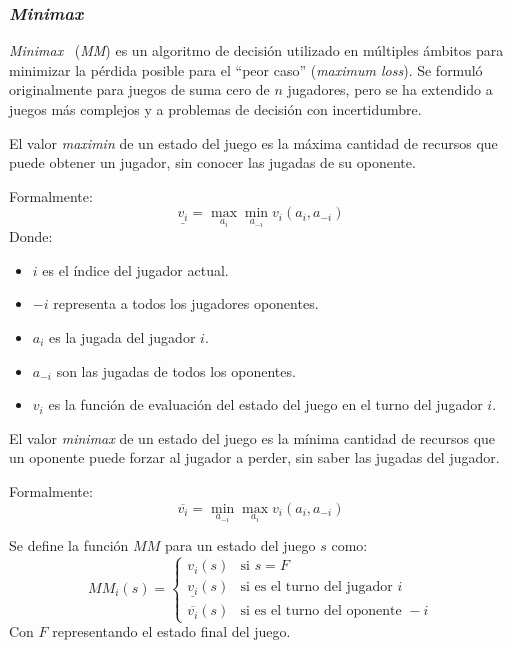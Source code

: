 \subsubsection{\textit{Minimax}}
  \textit{Minimax}~\cite{fanMinimaxTheorems1953} (\textit{MM}) es un 
  algoritmo de decisión utilizado en múltiples ámbitos para minimizar la pérdida posible para 
  el \enquote{peor caso} (\textit{maximum loss}). 
  Se formuló originalmente para juegos de suma cero de \(n\) jugadores, pero se ha extendido a
  juegos más complejos y a problemas de decisión con incertidumbre.

  \begin{definition}
    El valor \textit{maximin} de un estado del juego es la máxima cantidad de recursos que puede 
    obtener un jugador, sin conocer las jugadas de su oponente. 

    Formalmente:
    \[
      \underline{v_{i}} = \max_{a_{i}}\min_{a_{-i}}v_{i}(a_{i},a_{-i})
    \]
    Donde:
    \begin{itemize}
      \item \(i\) es el índice del jugador actual.
      \item \(-i\) representa a todos los jugadores oponentes. 
      \item \(a_i\) es la jugada del jugador \(i\).
      \item \(a_{-i}\) son las jugadas de todos los oponentes.
      \item \(v_i\) es la función de evaluación del estado del juego en el turno del jugador 
        \(i\).
    \end{itemize}
  \end{definition}

  \begin{definition}
    El valor \textit{minimax} de un estado del juego es la mínima cantidad de recursos que un 
    oponente puede forzar al jugador a perder, sin saber las jugadas del jugador.
    
    Formalmente:
    \[
      \overline{v_{i}} = 
        \min_{a_{-i}}\max_{a_{i}}{v_{i}(a_{i}, a_{-i})}
    \]
  \end{definition}


  \begin{definition}
    Se define la función \(MM\) para un estado del juego \(s\) como:
    \[
      MM_i(s) = \begin{cases}
        v_i(s) & \text{si } s = F  \\
        \underline{v_{i}}(s) & \text{si es el turno del jugador } i \\
        \overline{v_{i}}(s) & \text{si es el turno del oponente } -i
      \end{cases}  
    \]
    Con \(F\) representando el estado final del juego. 
  \end{definition}

